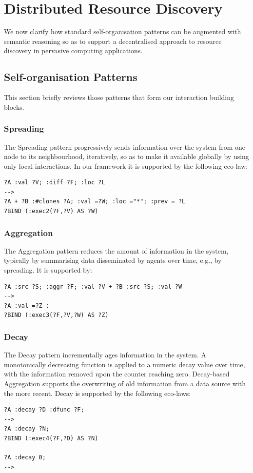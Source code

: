 \documentclass[12pt,a4paper,twoside,openright]{book}
\begin{document}
\section{Distributed Resource Discovery}
\label{sec:operational_framework}
We now clarify how standard self-organisation patterns can be augmented with semantic reasoning so as to support a decentralised approach to resource discovery in pervasive computing applications.

\subsection{Self-organisation Patterns}
This section briefly reviews those patterns that form our interaction building blocks.

\subsubsection{Spreading}
The Spreading pattern progressively sends information over the system from one node to its neighbourhood, iteratively, so as to make it available globally by using only local interactions.
%
In our framework it is supported by the following eco-law:
%
\begin{Verbatim}[samepage=true, frame=single, commandchars=\\\{\}, label={\small \bf Spreading}]
?A :val ?V; :diff ?F; :loc ?L
--> 
?A + ?B :#clones ?A; :val =?W; :loc ="*"; :prev = ?L
?BIND (:exec2(?F,?V) AS ?W)
\end{Verbatim}

\subsubsection{Aggregation}
The Aggregation pattern reduces the amount of information in the system, typically by summarising data disseminated by agents over time, e.g., by spreading.
%
It is supported by:
%
\begin{Verbatim}[samepage=true, frame=single, commandchars=\\\{\}, label={\small \bf Aggregation}]
?A :src ?S; :aggr ?F; :val ?V + ?B :src ?S; :val ?W 
--> 
?A :val =?Z :
?BIND (:exec3(?F,?V,?W) AS ?Z)
\end{Verbatim}

\subsubsection{Decay}
The Decay pattern incrementally ages information in the system.
%
A monotonically decreasing function is applied to a numeric decay value over time, with the information removed upon the counter reaching zero.
%
Decay-based Aggregation supports the overwriting of old information from a data source with the more recent.
%
Decay is supported by the following eco-laws:
%
\begin{Verbatim}[samepage=true, frame=single, commandchars=\\\{\}, label={\small \bf Decay}]
?A :decay ?D :dfunc ?F;
--> 
?A :decay ?N;
?BIND (:exec4(?F,?D) AS ?N)

?A :decay 0;
--> 
\end{Verbatim}
\end{document}
